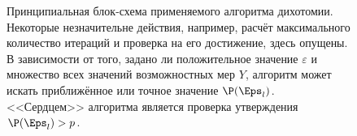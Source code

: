 \begin{figure}[h!]
\caption{\small Принципиальная блок-схема применяемого алгоритма дихотомии. Некоторые незначительне действия, например, расчёт максимального количество итераций и проверка на его достижение, здесь опущены. В зависимости от того, задано ли положительное значение $\varepsilon$ и множество всех значений возможностных мер $Y$, алгоритм может искать приближённое или точное значение $\P(\Eps_l)$. <<Сердцем>> алгоритма является проверка утверждения $\P(\Eps_l) > p$.}
\label{ris:algo_scheme}
\end{figure}

